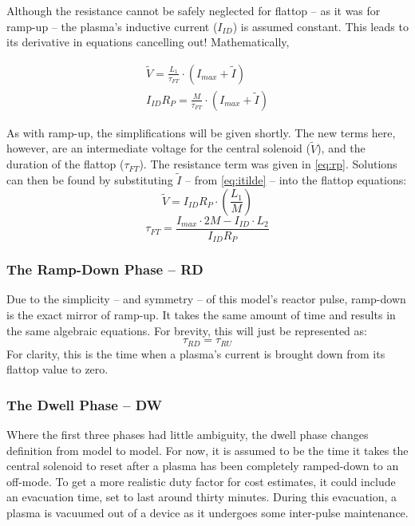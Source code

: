 Although the resistance cannot be safely neglected for flattop -- as it was for ramp-up -- the plasma's inductive current ($I_{ID}$) is assumed constant. This leads to its derivative in equations cancelling out! Mathematically,

\begin{align}
	\tilde V = \frac{L_1}{\tau_{FT}} \cdot \left( I_{max} + \tilde I \right) \\
	I_{ID} R_P = \frac{M}{\tau_{FT}} \cdot \left( I_{max} + \tilde I \right)
\end{align}

As with ramp-up, the simplifications will be given shortly. The new terms here, however, are an intermediate voltage for the central solenoid ($\tilde V$), and the duration of the flattop ($\tau_{FT}$). The resistance term was given in \cref{eq:rp}. Solutions can then be found by substituting $\tilde I$ -- from \cref{eq:itilde} -- into the flattop equations:
\begin{equation}
	\tilde V = I_{ID} R_P \cdot \left( \frac{L_1}{M} \right)
\end{equation}
\begin{equation}
	\label{eq:tauft}
	\tau_{FT} = \frac{ I_{max} \cdot 2 M - I_{ID} \cdot  L_2 }{I_{ID} R_P}
\end{equation}

\subsubsection{The Ramp-Down Phase -- RD}

Due to the simplicity -- and symmetry -- of this model's reactor pulse, ramp-down is the exact mirror of ramp-up. It takes the same amount of time and results in the same algebraic equations. For brevity, this will just be represented as:
\begin{equation}
	\label{eq:taurd}
	\tau_{RD} = \tau_{RU}
\end{equation}
For clarity, this is the time when a plasma's current is brought down from its flattop value to zero.

\subsubsection{The Dwell Phase -- DW}

Where the first three phases had little ambiguity, the dwell phase changes definition from model to model. For now, it is assumed to be the time it takes the central solenoid to reset after a plasma has been completely ramped-down to an off-mode. To get a more realistic duty factor for cost estimates, it could include an evacuation time, set to last around thirty minutes. During this evacuation, a plasma is vacuumed out of a device as it undergoes some inter-pulse maintenance.

